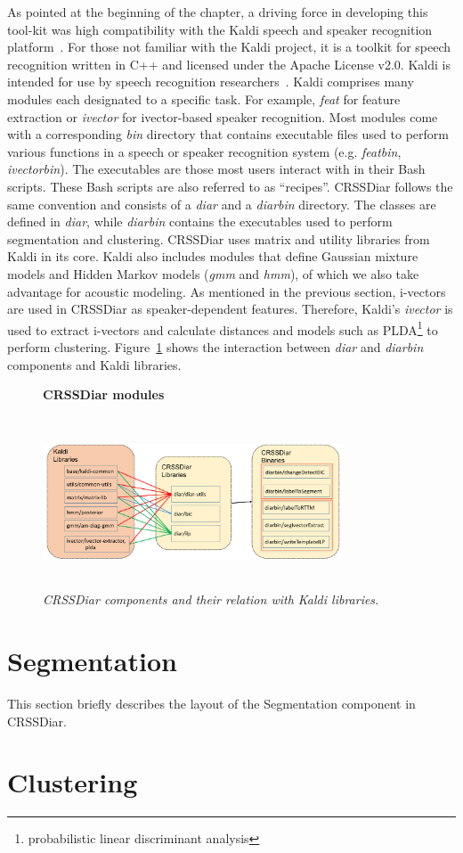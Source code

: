 As pointed at the beginning of the chapter, a driving force in developing this tool-kit was high compatibility with the Kaldi speech and speaker recognition platform~\cite{kaldi}. 
For those not familiar with the Kaldi project, it is a toolkit for speech recognition written in C++ and licensed under the Apache License v2.0. Kaldi is intended for use by speech recognition researchers~\cite{kaldi_doc}. 
Kaldi comprises many modules each designated to a specific task. For example, {\it feat} for feature extraction or {\it ivector} for ivector-based speaker recognition. 
Most modules come with a corresponding {\it bin} directory  that contains executable files used to perform various functions in a speech or speaker recognition system (e.g. {\it featbin}, {\it ivectorbin}). 
The executables are those most users interact with in their Bash scripts. These Bash scripts are also referred to as ``recipes''. 
CRSSDiar follows the same convention and consists of a {\it diar} and a {\it diarbin} directory. 
The classes are defined in {\it diar}, while {\it diarbin} contains the executables used to perform segmentation and clustering. 
CRSSDiar uses matrix and utility libraries from Kaldi in its core.  
Kaldi also includes modules that define Gaussian mixture models and Hidden Markov models ({\it gmm} and {\it hmm}), of which we also take advantage for acoustic modeling. 
As mentioned in the previous section, i-vectors are used in CRSSDiar as speaker-dependent features. 
Therefore, Kaldi's {\it ivector} is used to extract i-vectors and calculate distances and models such as PLDA\footnote{probabilistic linear discriminant analysis} to perform clustering. 
Figure~\ref{fig:crssdiar_vs_kaldi} shows the interaction between {\it diar} and {\it diarbin} components and Kaldi libraries. 

\begin{figure}[t!]
	\centering
	\textbf{CRSSDiar modules}\par\medskip
	\includegraphics[height = 2in, width=0.8\textwidth]{figures/crssdiar_and_kaldi}
	\caption{\it \small CRSSDiar components and their relation with Kaldi libraries.  }
	\label{fig:crssdiar_vs_kaldi}
	\vspace{-3mm}
\end{figure}

\section{Segmentation}
\label{sec:segmentation}
This section briefly describes the layout of the Segmentation component in CRSSDiar. 
\section{Clustering}
\label{sec:clustering}
